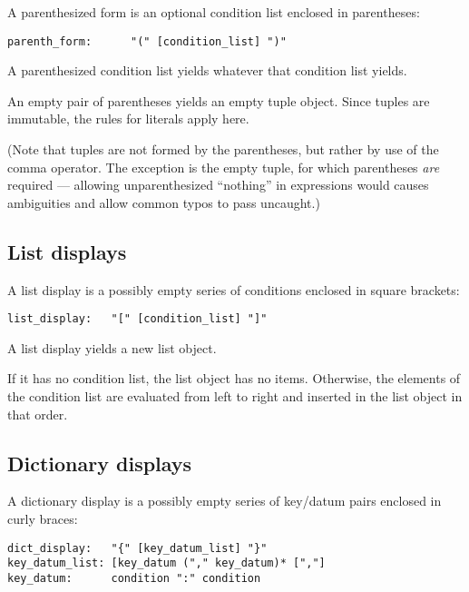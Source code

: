 A parenthesized form is an optional condition list enclosed in
parentheses:

\begin{verbatim}
parenth_form:      "(" [condition_list] ")"
\end{verbatim}

A parenthesized condition list yields whatever that condition list
yields.

An empty pair of parentheses yields an empty tuple object.  Since
tuples are immutable, the rules for literals apply here.

(Note that tuples are not formed by the parentheses, but rather by use
of the comma operator.  The exception is the empty tuple, for which
parentheses {\em are} required --- allowing unparenthesized ``nothing''
in expressions would causes ambiguities and allow common typos to
pass uncaught.)

\subsection{List displays}

A list display is a possibly empty series of conditions enclosed in
square brackets:

\begin{verbatim}
list_display:   "[" [condition_list] "]"
\end{verbatim}

A list display yields a new list object.

If it has no condition list, the list object has no items.  Otherwise,
the elements of the condition list are evaluated from left to right
and inserted in the list object in that order.

\subsection{Dictionary displays} \label{dict}

A dictionary display is a possibly empty series of key/datum pairs
enclosed in curly braces:

\begin{verbatim}
dict_display:   "{" [key_datum_list] "}"
key_datum_list: [key_datum ("," key_datum)* [","]
key_datum:      condition ":" condition
\end{verbatim}

